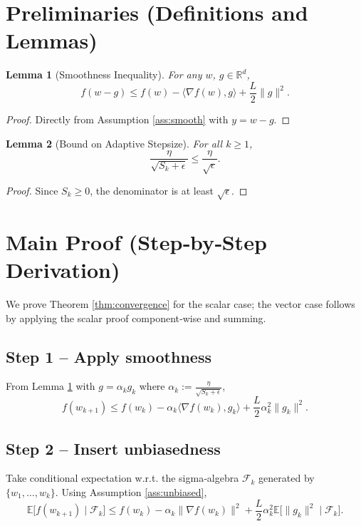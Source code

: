 \documentclass{article}
\newtheorem{lemma}{Lemma}
\newcommand{\E}{\mathbb{E}}
\newcommand{\R}{\mathbb{R}}
\begin{document}
\newpage

\section*{Preliminaries (Definitions and Lemmas)}
\begin{lemma}[Smoothness Inequality]
\label{lem:smooth}
For any $w$, $g\in\R^{d}$,
\[
f(w-g)\le f(w)-\langle\nabla f(w),g\rangle+\frac{L}{2}\|g\|^{2}.
\]
\end{lemma}
\begin{proof}
Directly from Assumption \ref{ass:smooth} with $y=w-g$.
\end{proof}

\begin{lemma}[Bound on Adaptive Stepsize]
\label{lem:stepbound}
For all $k\ge1$,
\[
\frac{\eta}{\sqrt{S_{k}+\epsilon}}\le\frac{\eta}{\sqrt{\epsilon}}.
\]
\end{lemma}
\begin{proof}
Since $S_{k}\ge0$, the denominator is at least $\sqrt{\epsilon}$.
\end{proof}

\section*{Main Proof (Step‑by‑Step Derivation)}
We prove Theorem \ref{thm:convergence} for the scalar case; the vector case follows by applying the scalar proof component‑wise and summing.

\subsection*{Step 1 – Apply smoothness}
From Lemma \ref{lem:smooth} with $g=\alpha_{k}g_{k}$ where $\alpha_{k}:=\frac{\eta}{\sqrt{S_{k}+\epsilon}}$,
\[
f(w_{k+1})\le f(w_{k})-\alpha_{k}\langle\nabla f(w_{k}),g_{k}\rangle
+\frac{L}{2}\alpha_{k}^{2}\|g_{k}\|^{2}.
\tag{S1}
\]

\subsection*{Step 2 – Insert unbiasedness}
Take conditional expectation w.r.t. the sigma‑algebra $\mathcal{F}_{k}$ generated by $\{w_{1},\dots,w_{k}\}$.
Using Assumption \ref{ass:unbiased},
\[
\E\!\big[f(w_{k+1})\mid\mathcal{F}_{k}\big]
\le f(w_{k})-\alpha_{k}\|\nabla f(w_{k})\|^{2}
+\frac{L}{2}\alpha_{k}^{2}\E\!\big[\|g_{k}\|^{2}\mid\mathcal{F}_{k}\big].
\tag{S2}
\]
\end{document}
